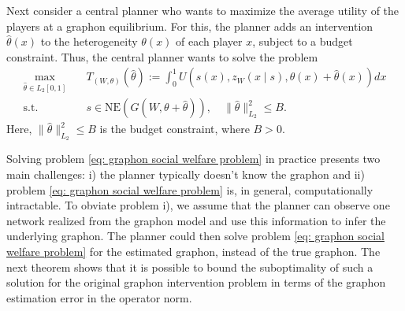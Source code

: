 \documentclass[11pt]{article}
\newcommand{\<}{\langle}
\renewcommand{\>}{\rangle}
\theoremstyle{plain}
\theoremstyle{definition}
\theoremstyle{remark}
\begin{document}

Next consider a central planner who wants to maximize the average utility of the players  at a graphon equilibrium. For this, the planner adds an intervention $\hat{\theta}(x)$ to the heterogeneity $\theta(x)$ of each player $x$, subject to a budget constraint. Thus, the central planner wants to solve the problem
\begin{align}
    \label{eq: graphon social welfare problem}
    \max _{\hat{\theta} \in L_2[0,1]} &\quad T_{(W,\theta)}(\hat{\theta}):= \int_0^1 U\left(s(x), z_W(x \mid s), \theta(x) + \hat{\theta}(x) \right) dx \\
    \text{s.t.} &\quad s \in \mathrm{NE}\left(G(W,\theta+\hat{\theta})\right), \quad \|\hat{\theta}\|_{L_2}^{2} \leq B. \nonumber
\end{align}
Here, $\|\hat{\theta}\|_{L_2}^{2} \leq B$ is the budget constraint, where $B>0$. 

Solving problem \eqref{eq: graphon social welfare problem} in practice presents two main challenges: i) the planner typically doesn't know the graphon  and ii) problem \eqref{eq: graphon social welfare problem} is, in general, computationally intractable. 
To obviate problem i), we  assume that the planner can observe one network realized from the graphon model and use this information to infer the underlying graphon. The planner could then solve problem \eqref{eq: graphon social welfare problem} for the estimated graphon, instead of the true graphon. The next theorem shows that it is possible to bound the suboptimality of such a solution for the original graphon intervention problem in terms of the graphon estimation error in the operator norm. 
\end{document}
